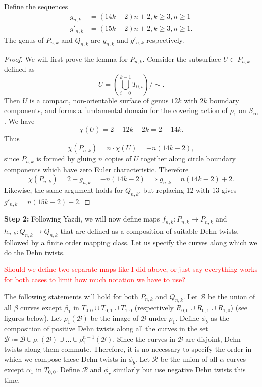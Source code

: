 \begin{lem}
Define the sequences
\begin{align}
    g_{n,k} &= (14k - 2)n + 2, k \geq 3, n \geq 1 \\
    g'_{n,k} &= (15k - 2)n + 2, k \geq 3, n \geq 1.
\end{align}
    The genus of $P_{n,k}$ and $Q_{n,k}$ are $g_{n,k}$ and $g'_{n,k}$ respectively. 
\end{lem}
\begin{proof}
    We will first prove the lemma for $P_{n,k}$. Consider the subsurface $U \subset P_{n,k}$ defined as $$U = \left( \bigcup_{i =0}^{k-1} T_{0,i} \right)/\sim.$$ Then $U$ is a compact, non-orientable surface of genus $12k$ with $2k$ boundary components, and forms a fundamental domain for the covering action of $\overline{\rho_1}$ on $S_\infty$. We have $$\chi(U) = 2 - 12k - 2k = 2 - 14k.$$ Thus $$\chi(P_{n,k}) = n \cdot \chi(U) = -n(14k - 2),$$ since $P_{n,k}$ is formed by gluing $n$ copies of $U$ together along circle boundary components which have zero Euler characteristic. Therefore $$\chi(P_{n,k}) = 2 - g_{n,k} = -n(14k - 2) \implies g_{n,k} = n(14k - 2) + 2.$$ Likewise, the same argument holds for $Q_{n,k}$, but replacing 12 with 13 gives $g'_{n,k} = n(15k - 2) + 2$.
\end{proof}

\textbf{Step 2:} Following Yazdi, we will now define maps $f_{n,k}: P_{n,k} \xrightarrow[]{} P_{n,k}$ and $h_{n,k}: Q_{n,k} \xrightarrow[]{} Q_{n,k}$ that are defined as a composition of suitable Dehn twists, followed by a finite order mapping class. Let us specify the curves along which we do the Dehn twists.

\textcolor{red}{Should we define two separate maps like I did above, or just say everything works for both cases to limit how much notation we have to use?}

The following statements will hold for both $P_{n,k}$ and $Q_{n,k}$. Let $\mathcal{B}$ be the union of all $\beta$ curves except $\beta_1$ in $T_{0,0} \cup T_{0,1} \cup T_{1,0}$ (respectively $R_{0,0} \cup R_{0,1} \cup R_{1,0}$) (see figures below). Let $\rho_1(\mathcal{B})$ be the image of $\mathcal{B}$ under $\rho_1$. Define $\phi_b$ as the composition of positive Dehn twists along all the curves in the set $\overline{\mathcal{B}} \coloneqq \mathcal{B} \cup \rho_1(\mathcal{B}) \cup \dots \cup \rho_1^{n-1}(\mathcal{B})$. Since the curves in $\overline{\mathcal{B}}$ are disjoint, Dehn twists along them commute. Therefore, it is no necessary to specify the order in which we compose these Dehn twists in $\phi_b$. Let $\mathcal{R}$ be the union of all $\alpha$ curves except $\alpha_1$ in $T_{0,0}$. Define $\mathcal{R}$ and $\phi_r$ similarly but use negative Dehn twists this time.

